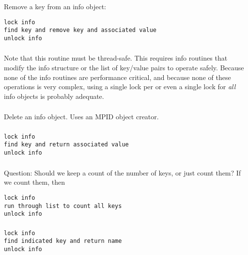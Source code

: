 \documentclass{article}
\begin{document}
\subsubsection{}
Remove a key from an info object:
\begin{verbatim}
lock info
find key and remove key and associated value
unlock info
\end{verbatim}

\subsubsection{}
Note that this routine must be thread-safe.  This requires info routines that
modify the info structure or the list of key/value pairs to operate safely.
Because none of the info routines are performance critical, and because none
of these operations is very complex, using a single lock per 
or even a single lock for \emph{all} info objects is probably adequate.

\subsubsection{}
Delete an info object.  Uses an MPID object creator.

\subsubsection{}
\begin{verbatim}
lock info
find key and return associated value
unlock info
\end{verbatim}

\subsubsection{}
Question:  Should we keep a count of the number of keys, or just count them?
If we count them, then
\begin{verbatim}
lock info
run through list to count all keys
unlock info
\end{verbatim}

\subsubsection{}
\begin{verbatim}
lock info
find indicated key and return name
unlock info
\end{verbatim}
\end{document}
